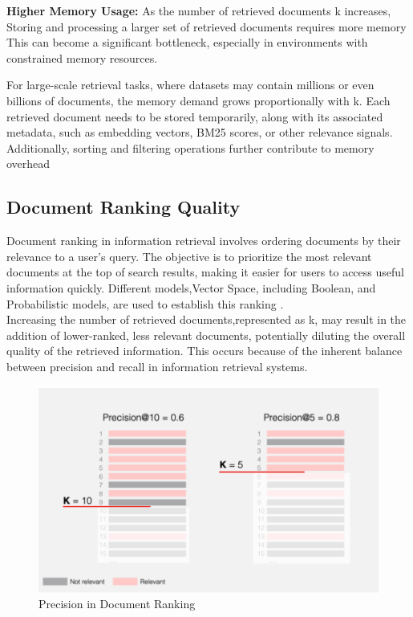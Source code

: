 \textbf{Higher Memory Usage:}
As the number of retrieved documents k increases, Storing and processing a larger set of retrieved documents requires more memory This can become a significant bottleneck, especially in environments with constrained memory resources.

For large-scale retrieval tasks, where datasets may contain millions or even billions of documents, the memory demand grows proportionally with k. Each retrieved document needs to be stored temporarily, along with its associated metadata, such as embedding vectors, BM25 scores, or other relevance signals. Additionally, sorting and filtering operations further contribute to memory overhead
\subsection{Document Ranking Quality}
Document ranking in information retrieval involves ordering documents by their relevance to a user's query. The objective is to prioritize the most relevant documents at the top of search results, making it easier for users to access useful information quickly. Different models,Vector Space, including Boolean, and Probabilistic models, are used to establish this ranking \citep{enwiki:1262179867}.\\

Increasing the number of retrieved documents,represented as k, may result in the addition of lower-ranked, less relevant documents, potentially diluting the overall quality of the retrieved information. This occurs because of the inherent balance between precision and recall in information retrieval systems.
\begin{figure}[h]
	\centering
	\includegraphics[width=0.7\linewidth]{Figures/precisionR.png}
	\caption{Precision in Document Ranking}
	\label{precisionR}
	
\end{figure}

